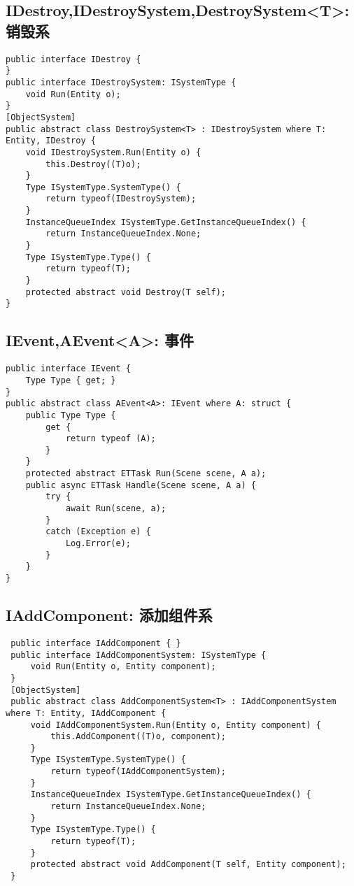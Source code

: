 \documentclass[9pt, b5paper]{article}
\begin{document}
\subsection{IDestroy,IDestroySystem,DestroySystem<T>: 销毁系}
\label{sec-1-12}
\begin{verbatim}
public interface IDestroy {
}
public interface IDestroySystem: ISystemType {
    void Run(Entity o);
}
[ObjectSystem]
public abstract class DestroySystem<T> : IDestroySystem where T: Entity, IDestroy {
    void IDestroySystem.Run(Entity o) {
        this.Destroy((T)o);
    }
    Type ISystemType.SystemType() {
        return typeof(IDestroySystem);
    }
    InstanceQueueIndex ISystemType.GetInstanceQueueIndex() {
        return InstanceQueueIndex.None;
    }
    Type ISystemType.Type() {
        return typeof(T);
    }
    protected abstract void Destroy(T self);
}
\end{verbatim}
\subsection{IEvent,AEvent<A>: 事件}
\label{sec-1-13}
\begin{verbatim}
public interface IEvent {
    Type Type { get; }
}
public abstract class AEvent<A>: IEvent where A: struct {
    public Type Type {
        get {
            return typeof (A);
        }
    }
    protected abstract ETTask Run(Scene scene, A a);
    public async ETTask Handle(Scene scene, A a) {
        try {
            await Run(scene, a);
        }
        catch (Exception e) {
            Log.Error(e);
        }
    }
}
\end{verbatim}
\subsection{IAddComponent: 添加组件系}
\label{sec-1-14}
\begin{verbatim}
 public interface IAddComponent { }
 public interface IAddComponentSystem: ISystemType {
     void Run(Entity o, Entity component);
 }
 [ObjectSystem]
 public abstract class AddComponentSystem<T> : IAddComponentSystem where T: Entity, IAddComponent {
     void IAddComponentSystem.Run(Entity o, Entity component) {
         this.AddComponent((T)o, component);
     }
     Type ISystemType.SystemType() {
         return typeof(IAddComponentSystem);
     }
     InstanceQueueIndex ISystemType.GetInstanceQueueIndex() {
         return InstanceQueueIndex.None;
     }
     Type ISystemType.Type() {
         return typeof(T);
     }
     protected abstract void AddComponent(T self, Entity component);
 }
\end{verbatim}
\end{document}

